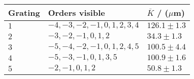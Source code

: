 	\begin{tabular}{|p{3.82cm}|p{6.18cm}|p{3.82cm}|}
		\hline
		\rowcolor{LightCyan}
		Grating & Orders visible & $\overline{K}$ / ($\mu$m)  \\ \hline
		$1$  & $-4, -3, -2, -1, 0, 1, 2, 3, 4$ & $ 126.1 \pm 1.3$ \\
		$2$  & $-3, -2, -1, 0, 1, 2$ & $ 34.3 \pm 1.3$ \\
		$3$  & $-5, -4, -2, -1, 0, 1, 2, 4, 5$ & $ 100.5 \pm 4.4$ \\
		$4$  & $-5, -3, -1, 0, 1, 3, 5$ & $ 100.9 \pm 1.6$ \\
		$5$  & $-2, -1, 0, 1, 2$ & $ 50.8 \pm 1.3$ \\
		\hline
	\end{tabular}
